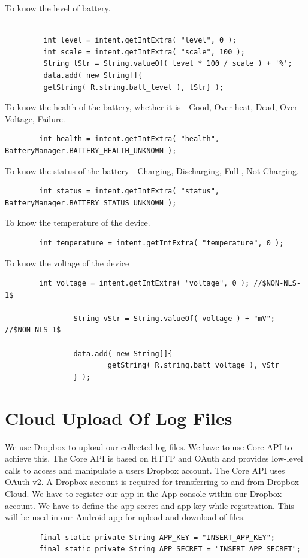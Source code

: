 \documentclass[12pt]{report}
\begin{document}
To know the level of battery.
\begin{lstlisting}

         int level = intent.getIntExtra( "level", 0 ); 
         int scale = intent.getIntExtra( "scale", 100 ); 
         String lStr = String.valueOf( level * 100 / scale ) + '%';
         data.add( new String[]{
         getString( R.string.batt_level ), lStr} );
\end{lstlisting}
To know the health of the battery, whether it is - Good, Over heat, Dead, Over Voltage, Failure.
\begin{lstlisting}
        int health = intent.getIntExtra( "health", BatteryManager.BATTERY_HEALTH_UNKNOWN );
\end{lstlisting}
To know the status of the battery - Charging, Discharging, Full , Not Charging. 
\begin{lstlisting}
        int status = intent.getIntExtra( "status", BatteryManager.BATTERY_STATUS_UNKNOWN );
\end{lstlisting}
To know the temperature of the device.
\begin{lstlisting}
        int temperature = intent.getIntExtra( "temperature", 0 ); 
\end{lstlisting}
To know the voltage of the device
\begin{lstlisting}
        int voltage = intent.getIntExtra( "voltage", 0 ); //$NON-NLS-1$

				String vStr = String.valueOf( voltage ) + "mV"; //$NON-NLS-1$

				data.add( new String[]{
						getString( R.string.batt_voltage ), vStr
				} );
\end{lstlisting}

\section{Cloud Upload Of Log Files}
We use Dropbox to upload our collected log files. We have to use Core API to achieve this. The Core API is based on HTTP and OAuth and provides low-level calls to access and manipulate a user\textquotesingle s Dropbox account. The Core API uses OAuth v2.
A Dropbox account is required for transferring to and from Dropbox Cloud.
We have to register our app in the App console within our Dropbox account. We have to define the app secret and app key while registration.
This will be used in our Android app for upload and download of files.
\begin{lstlisting}
        final static private String APP_KEY = "INSERT_APP_KEY";
        final static private String APP_SECRET = "INSERT_APP_SECRET";
\end{lstlisting}
\end{document}
